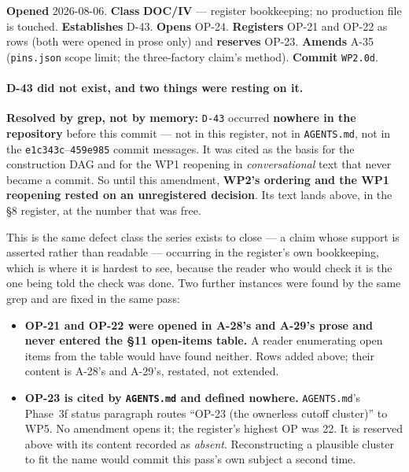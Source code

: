 \documentclass[
  10pt,
]{article}
\providecommand{\tightlist}{%
  \setlength{\itemsep}{0pt}\setlength{\parskip}{0pt}}
\begin{document}
\textbf{Opened} 2026-08-06. \textbf{Class} \textbf{DOC/IV} --- register bookkeeping; no production file is touched. \textbf{Establishes} D-43. \textbf{Opens} OP-24. \textbf{Registers} OP-21 and OP-22 as rows (both were opened in prose only) and \textbf{reserves} OP-23. \textbf{Amends} A-35 (\texttt{pins.json} scope limit; the three-factory claim's method). \textbf{Commit} \texttt{WP2.0d}.

\paragraph{D-43 did not exist, and two things were resting on it.}
\textbf{Resolved by grep, not by memory:} \texttt{D-43} occurred \textbf{nowhere in the repository} before this commit --- not in this register, not in \texttt{AGENTS.md}, not in the \texttt{e1c343c}--\texttt{459e985} commit messages. It was cited as the basis for the construction DAG and for the WP1 reopening in \emph{conversational} text that never became a commit. So until this amendment, \textbf{WP2's ordering and the WP1 reopening rested on an unregistered decision}. Its text lands above, in the §8 register, at the number that was free.

This is the same defect class the series exists to close --- a claim whose support is asserted rather than readable --- occurring in the register's own bookkeeping, which is where it is hardest to see, because the reader who would check it is the one being told the check was done. Two further instances were found by the same grep and are fixed in the same pass:

\begin{itemize}
\tightlist
\item \textbf{OP-21 and OP-22 were opened in A-28's and A-29's prose and never entered the §11 open-items table.} A reader enumerating open items from the table would have found neither. Rows added above; their content is A-28's and A-29's, restated, not extended.
\item \textbf{OP-23 is cited by \texttt{AGENTS.md} and defined nowhere.} \texttt{AGENTS.md}'s Phase~3f status paragraph routes ``OP-23 (the ownerless cutoff cluster)'' to WP5. No amendment opens it; the register's highest OP was 22. It is reserved above with its content recorded as \emph{absent}. Reconstructing a plausible cluster to fit the name would commit this pass's own subject a second time.
\end{itemize}
\end{document}

